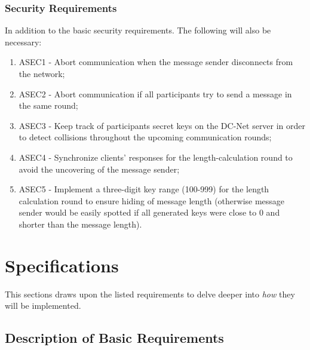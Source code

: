 \subsubsection{Security Requirements}
In addition to the basic security requirements. The following will also be necessary:
\begin{enumerate}
    \item ASEC1 - Abort communication when the message sender disconnects from the network;
    \item ASEC2 - Abort communication if all participants try to send a message in the same round;
    \item ASEC3 - Keep track of participants secret keys on the DC-Net server in order to detect collisions throughout the upcoming communication rounds;
    \item ASEC4 - Synchronize clients' responses for the length-calculation round to avoid the uncovering of the message sender;
    \item ASEC5 - Implement a three-digit key range (100-999) for the length calculation round to ensure hiding of message length (otherwise message sender would be easily spotted if all generated keys were close to 0 and shorter than the message length).
\end{enumerate}


\section{Specifications}
This sections draws upon the listed requirements to delve deeper into \emph{how} they will be implemented.


\subsection{Description of Basic Requirements}


